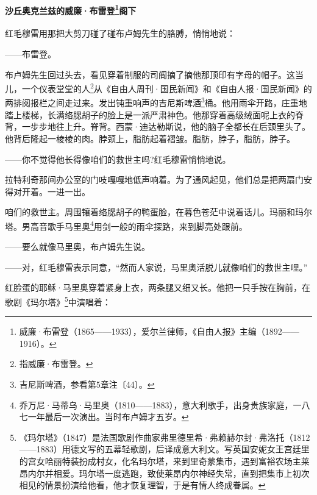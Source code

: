 \paragraph*{沙丘奥克兰兹的威廉·布雷登\footnote{威廉·布雷登（1865——1933），爱尔兰律师，《自由人报》主编（1892——1916）。}阁下}
\par 红毛穆雷用那把大剪刀碰了碰布卢姆先生的胳膊，悄悄地说：
\par ——布雷登。
\par 布卢姆先生回过头去，看见穿着制服的司阍摘了摘他那顶印有字母的帽子。这当儿，一个仪表堂堂的人\footnote{指威廉·布雷登。}从《自由人周刊·国民新闻》和《自由人报·国民新闻》的两排阅报栏之间走过来。发出钝重响声的吉尼斯啤酒\footnote{吉尼斯啤酒，参看第5章注〔44〕。}桶。他用雨伞开路，庄重地踏上楼梯，长满络腮胡子的脸上是一派严肃神色。他那穿着高级绒面呢上衣的脊背，一步步地往上升。脊背。西蒙·迪达勒斯说，他的脑子全都长在后颈里头了。他背后隆起一棱棱的肉。脖颈上，脂肪起着褶皱。脂肪，脖子，脂肪，脖子。
\par ——你不觉得他长得像咱们的救世主吗?红毛穆雷悄悄地说。
\par 拉特利奇那间办公室的门吱嘎嘎地低声响着。为了通风起见，他们总是把两扇门安得对开着。一进一出。
\par 咱们的救世主。周围镶着络腮胡子的鸭蛋脸，在暮色苍茫中说着话儿。玛丽和玛尔塔。男高音歌手马里奥\footnote{乔万尼·马蒂乌·马里奥（1810——1883），意大利歌手，出身贵族家庭，一八七一年最后一次演出。当时布卢姆才五岁。}用剑一般的雨伞探路，来到脚亮处跟前。
\par ——要么就像马里奥，布卢姆先生说。
\par ——对，红毛穆雷表示同意，“然而人家说，马里奥活脱儿就像咱们的救世主哩。”
\par 红脸蛋的耶稣·马里奥穿着紧身上衣，两条腿又细又长。他把一只手按在胸前，在歌剧《玛尔塔》\footnote{《玛尔塔》（1847）是法国歌剧作曲家弗里德里希·弗赖赫尔封·弗洛托（1812——1883）用德文写的五幕轻歌剧，后译成意大利文。写英国安妮女王宫廷里的宫女哈丽特装扮成村女，化名玛尔塔，来到里奇蒙集市，遇到富裕农场主莱昂内尔并相爱。玛尔塔一度逃跑，致使莱昂内尔神经失常，直到把集市上初次相见的情景扮演给他看，他才恢复理智，于是有情人终成眷属。}中演唱着：

